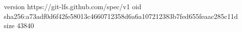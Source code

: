 version https://git-lfs.github.com/spec/v1
oid sha256:a73adf0d6f42fe58013c4660712358d6a6a107212383b7fed655feaac285c11d
size 43840
